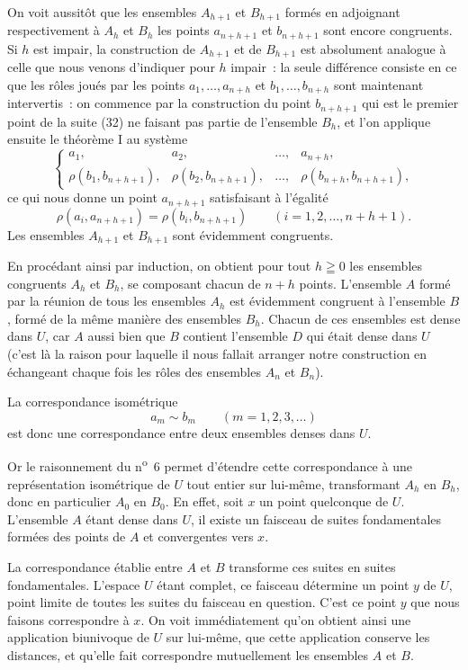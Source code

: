 \documentclass[a4paper,12pt]{amsart}
\newcommand{\srcpage}[1]{} %
\begin{document}
On voit aussitôt que les ensembles $A_{h+1}$ et $B_{h+1}$ formés en adjoignant respectivement à $A_h$ et $B_h$ les points $a_{n+h+1}$ et $b_{n+h+1}$ sont encore congruents. Si $h$ est impair, la construction de $A_{h+1}$ et de $B_{h+1}$ est absolument analogue à celle que nous venons d'indiquer pour $h$ impair~: la seule différence consiste en ce que les rôles joués par les points $a_1,\dots,a_{n+h}$ et $b_1,\dots,b_{n+h}$ sont maintenant intervertis~: on commence par la construction du point $b_{n+h+1}$ qui est le premier point de la suite (32) ne faisant pas partie de l'ensemble $B_h$, et l'on applique ensuite le théorème I au système
\begin{equation}\tag{33 b}
\left\{\begin{array}{cccc}
a_1,&a_2,&\dots,&a_{n+h},\\
\rho(b_1,b_{n+h+1}),&\rho(b_2,b_{n+h+1}),&\dots,&\rho(b_{n+h},b_{n+h+1}),
\end{array}\right.
\end{equation}
ce qui nous donne un point $a_{n+h+1}$ satisfaisant à l'égalité
\[
\rho(a_i,a_{n+h+1})=\rho(b_i,b_{n+h+1})\qquad(i=1,2,\dots,n+h+1).
\]
Les ensembles $A_{h+1}$ et $B_{h+1}$ sont évidemment congruents.
\srcpage{76}
En procédant ainsi par induction, on obtient pour tout $h\geqq0$ les ensembles congruents $A_h$ et $B_h$, se composant chacun de $n+h$ points. L'ensemble $A$ formé par la réunion de tous les ensembles $A_h$ est évidemment congruent à l'ensemble $B$, formé de la même manière des ensembles $B_h$. Chacun de ces ensembles est dense dans $U$, car $A$ aussi bien que $B$ contient l'ensemble $D$ qui était dense dans $U$ (c'est là la raison pour laquelle il nous fallait arranger notre construction en échangeant chaque fois les rôles des ensembles $A_n$ et $B_n$).

La correspondance isométrique
\begin{equation}\tag{34}
a_m\sim b_m\qquad(m=1,2,3,\dots)
\end{equation}
est donc une correspondance entre deux ensembles denses dans $U$.

Or le raisonnement du n\textsuperscript{o}~6 permet d'étendre cette correspondance à une représentation isométrique de $U$ tout entier sur lui-même, transformant $A_h$ en $B_h$, donc en particulier $A_0$ en $B_0$. En effet, soit $x$ un point quelconque de $U$. L'ensemble $A$ étant dense dans $U$, il existe un faisceau de suites fondamentales formées des points de $A$ et convergentes vers $x$.

La correspondance établie entre $A$ et $B$ transforme ces suites en suites fondamentales. L'espace $U$ étant complet, ce faisceau détermine un point $y$ de $U$, point limite de toutes les suites du faisceau en question. C'est ce point $y$ que nous faisons correspondre à $x$. On voit immédiatement qu'on obtient ainsi une application biunivoque de $U$ sur lui-même, que cette application conserve les distances, et qu'elle fait correspondre mutuellement les ensembles $A$ et $B$.
\end{document}
